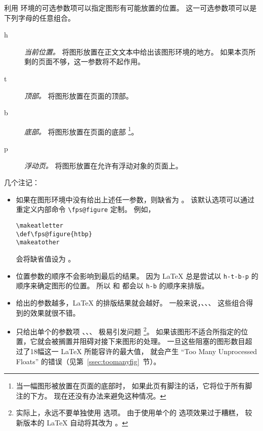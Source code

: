 利用  环境的可选参数项可以指定图形有可能放置的位置。
这一可选参数项可以是下列字母的任意组合。
\begin{description}
	\item [h] \emph{当前位置。} 
	将图形放置在正文文本中给出该图形环境的地方。
	如果本页所剩的页面不够，这一参数将不起作用。
	\item [t] \emph{顶部。} 将图形放置在页面的顶部。
	\item [b] \emph{底部。} 将图形放置在页面的底部
	\footnote{当一幅图形被放置在页面的底部时，
		如果此页有脚注的话，它将位于所有脚注的下方。
		现在还没有办法来避免这种情况。}。
	\item [p] \emph{ 浮动页。} 将图形放置在允许有浮动对象的页面上。
\end{description}

几个注记：
\begin{itemize}
	\item 如果在图形环境中没有给出上述任一参数，则缺省为 \opt{[tbp]}。
	该默认选项可以通过重定义内部命令 \verb|\fps@figure| 定制。
	例如，
\begin{lstlisting}
\makeatletter
\def\fps@figure{htbp}
\makeatother
\end{lstlisting}
	会将缺省值设为 \opt{[htbp]}。
	
	\item 位置参数的顺序不会影响到最后的结果。
	因为 \LaTeX{} 总是尝试以 \texttt{h-t-b-p} 的顺序来确定图形的位置。
	所以 \opt{[hb]} 和 \opt{[bh]} 都会以 \texttt{h-b}	的顺序来排版。
	
	\item 给出的参数越多，\LaTeX{} 的排版结果就会越好。
	一般来说，\opt{[htbp]}、\opt{[tbp]}、\opt{[htp]}、\opt{[tp]} 这些组合得到的效果就很不错。
	
	\item 只给出单个的参数项 \opt{[t]}、\opt{[b]}、\opt{[p]}、\opt{[h]} 极易引发问题
	\footnote{实际上，永远不要单独使用 \opt{[h]} 选项。
		由于使用单个的 \opt{[h]} 选项效果过于糟糕，
		较新版本的 \LaTeX{} 自动将其改为 \opt{[ht]}。}。
	如果该图形不适合所指定的位置，它就会被搁置并阻碍对接下来图形的处理。
	一旦这些阻塞的图形数目超过了18幅这一 \LaTeX{} 所能容许的最大值，
	就会产生 ``Too Many Unprocessed Floats'' 的错误（见第~\ref{ssec:toomanyfig}~节）。
\end{itemize}

